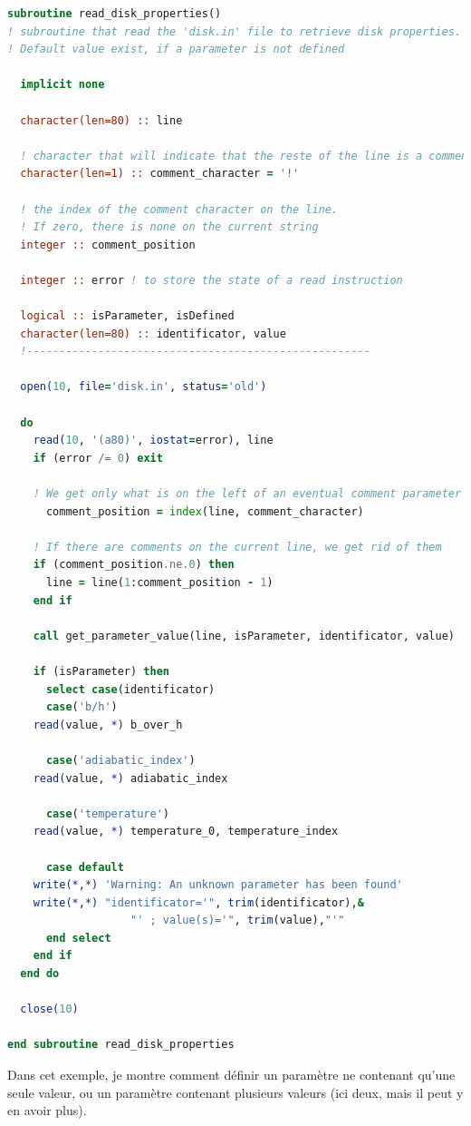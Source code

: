 \documentclass[a4paper,twoside]{article}
\begin{document}
\begin{lstlisting}[language=Fortran]
subroutine read_disk_properties()
! subroutine that read the 'disk.in' file to retrieve disk properties. 
! Default value exist, if a parameter is not defined

  implicit none
  
  character(len=80) :: line

  ! character that will indicate that the reste of the line is a comment
  character(len=1) :: comment_character = '!' 
  
  ! the index of the comment character on the line. 
  ! If zero, there is none on the current string
  integer :: comment_position 

  integer :: error ! to store the state of a read instruction
  
  logical :: isParameter, isDefined
  character(len=80) :: identificator, value
  !-----------------------------------------------------
  
  open(10, file='disk.in', status='old')
  
  do
    read(10, '(a80)', iostat=error), line
    if (error /= 0) exit
      
    ! We get only what is on the left of an eventual comment parameter
      comment_position = index(line, comment_character)
    
    ! If there are comments on the current line, we get rid of them
    if (comment_position.ne.0) then
      line = line(1:comment_position - 1)
    end if
    
    call get_parameter_value(line, isParameter, identificator, value)
      
    if (isParameter) then
      select case(identificator)
      case('b/h')
	read(value, *) b_over_h
      
      case('adiabatic_index')
	read(value, *) adiabatic_index

      case('temperature')
	read(value, *) temperature_0, temperature_index
	
      case default
	write(*,*) 'Warning: An unknown parameter has been found'
	write(*,*) "identificator='", trim(identificator),&
                   "' ; value(s)='", trim(value),"'"
      end select
    end if
  end do
  
  close(10)
    
end subroutine read_disk_properties
\end{lstlisting}

Dans cet exemple, je montre comment définir un paramètre ne contenant qu'une seule valeur, ou un paramètre contenant plusieurs valeurs (ici deux, mais il peut y en avoir plus). 
\end{document}
